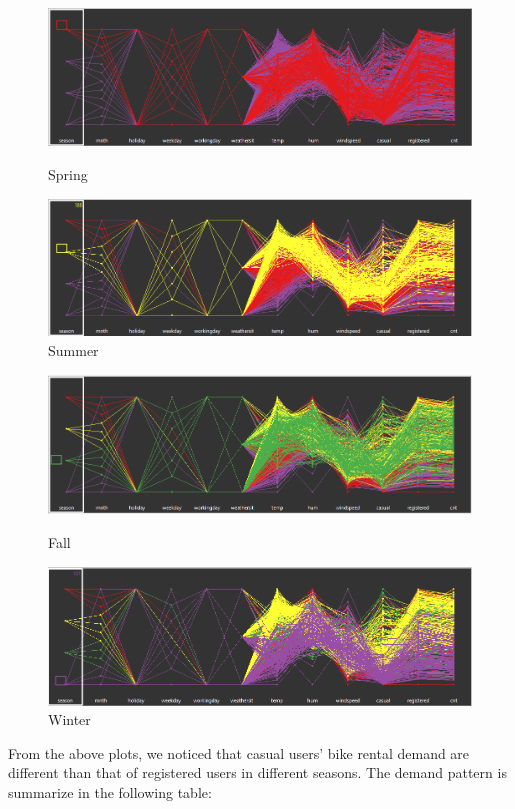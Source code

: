 \documentclass[12pt]{article}
\begin{document}
	 \begin{figure}[H]
	 	\centering
	 	\begin{minipage}{.5\textwidth}
	 		\centering
	 		\includegraphics[width=\linewidth]{figures/spring_pcor.png}
	 		\caption{Spring}
	 	\end{minipage}%
	 	\begin{minipage}{.5\textwidth}
	 		\centering
	 		\includegraphics[width=\linewidth]{figures/summer_pcor.png}
	 		\caption{Summer}
	 	\end{minipage}
	 \end{figure}
	 
	 \begin{figure}[H]
	 	\centering
	 	\begin{minipage}{.5\textwidth}
	 		\centering
	 		\includegraphics[width=\linewidth]{figures/fall_pcor.png}
	 		\caption{Fall}
	 	\end{minipage}%
	 	\begin{minipage}{.5\textwidth}
	 		\centering
	 		\includegraphics[width=\linewidth]{figures/winter_pcor.png}
	 		\caption{Winter}
	 	\end{minipage}
	 \end{figure}
	From the above plots, we noticed that casual users' bike rental demand are different than that of registered users in different seasons. The demand pattern is summarize in the following table:
	
\end{document}
